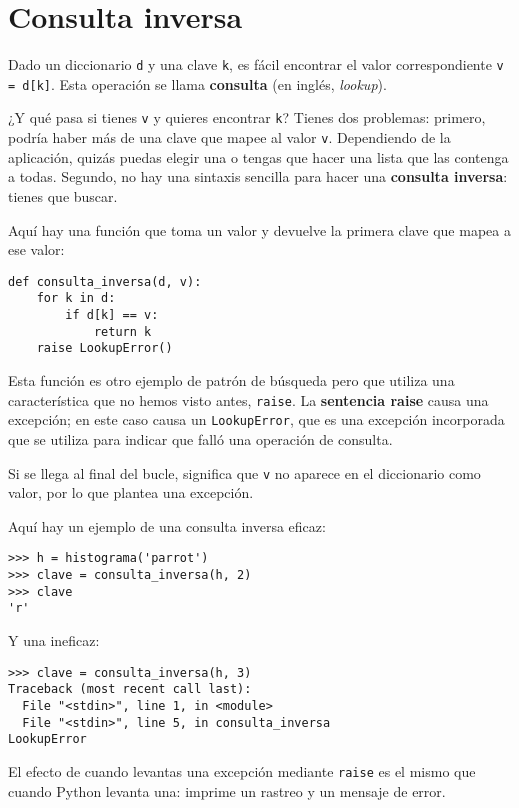 \documentclass[10pt]{book}
\begin{document}
\section{Consulta inversa}
\label{raise}

Dado un diccionario {\tt d} y una clave {\tt k}, es fácil
encontrar el valor correspondiente {\tt v = d[k]}.  Esta operación
se llama {\bf consulta} (en inglés, {\em lookup}).

¿Y qué pasa si tienes {\tt v} y quieres encontrar {\tt k}?
Tienes dos problemas: primero, podría haber más de una
clave que mapee al valor {\tt v}.  Dependiendo de la aplicación,
quizás puedas elegir una o tengas que hacer
una lista que las contenga a todas.  Segundo, no hay
una sintaxis sencilla para hacer una {\bf consulta inversa}: tienes que buscar.

Aquí hay una función que toma un valor y devuelve la primera
clave que mapea a ese valor:

\begin{verbatim}
def consulta_inversa(d, v):
    for k in d:
        if d[k] == v:
            return k
    raise LookupError()
\end{verbatim}
%
Esta función es otro ejemplo de patrón de búsqueda pero que
utiliza una característica que no hemos visto antes, {\tt raise}.  La
{\bf sentencia raise} causa una excepción; en este caso causa un
{\tt LookupError}, que es una excepción incorporada que se utiliza para indicar
que falló una operación de consulta.
  
 

Si se llega al final del bucle, significa que {\tt v}
no aparece en el diccionario como valor, por lo que plantea una
excepción.

Aquí hay un ejemplo de una consulta inversa eficaz:

\begin{verbatim}
>>> h = histograma('parrot')
>>> clave = consulta_inversa(h, 2)
>>> clave 
'r'
\end{verbatim}
%
Y una ineficaz:

\begin{verbatim}
>>> clave = consulta_inversa(h, 3)
Traceback (most recent call last):
  File "<stdin>", line 1, in <module>
  File "<stdin>", line 5, in consulta_inversa
LookupError
\end{verbatim}
%
El efecto de cuando levantas una excepción mediante {\tt raise} es el mismo que cuando
Python levanta una: imprime un rastreo y un mensaje de error.
\end{document}
